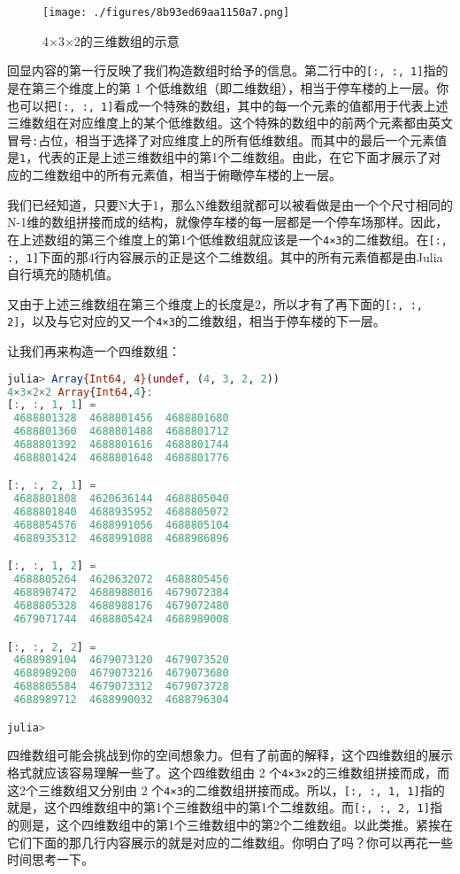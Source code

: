 \begin{figure}[ht]
\centering
\texttt{[image: ./figures/8b93ed69aa1150a7.png]}
\caption{4×3×2的三维数组的示意} \label{fig_JuC9S3_1}
\end{figure}


回显内容的第一行反映了我们构造数组时给予的信息。第二行中的\verb`[:, :, 1]`指的是在第三个维度上的第 1 个低维数组（即二维数组），相当于停车楼的上一层。你也可以把\verb`[:, :, 1]`看成一个特殊的数组，其中的每一个元素的值都用于代表上述三维数组在对应维度上的某个低维数组。这个特殊的数组中的前两个元素都由英文冒号\verb`:`占位，相当于选择了对应维度上的所有低维数组。而其中的最后一个元素值是\verb`1`，代表的正是上述三维数组中的第1个二维数组。由此，在它下面才展示了对应的二维数组中的所有元素值，相当于俯瞰停车楼的上一层。

我们已经知道，只要N大于1，那么N维数组就都可以被看做是由一个个尺寸相同的N-1维的数组拼接而成的结构，就像停车楼的每一层都是一个停车场那样。因此，在上述数组的第三个维度上的第1个低维数组就应该是一个\verb`4×3`的二维数组。在\verb`[:, :, 1]`下面的那4行内容展示的正是这个二维数组。其中的所有元素值都是由Julia自行填充的随机值。

又由于上述三维数组在第三个维度上的长度是2，所以才有了再下面的\verb`[:, :, 2]`，以及与它对应的又一个\verb`4×3`的二维数组，相当于停车楼的下一层。

让我们再来构造一个四维数组：

\begin{lstlisting}[language=julia]
julia> Array{Int64, 4}(undef, (4, 3, 2, 2))
4×3×2×2 Array{Int64,4}:
[:, :, 1, 1] =
 4688801328  4688801456  4688801680
 4688801360  4688801488  4688801712
 4688801392  4688801616  4688801744
 4688801424  4688801648  4688801776

[:, :, 2, 1] =
 4688801808  4620636144  4688805040
 4688801840  4688935952  4688805072
 4688854576  4688991056  4688805104
 4688935312  4688991088  4688986896

[:, :, 1, 2] =
 4688805264  4620632072  4688805456
 4688987472  4688988016  4679072384
 4688805328  4688988176  4679072480
 4679071744  4688805424  4688989008

[:, :, 2, 2] =
 4688989104  4679073120  4679073520
 4688989200  4679073216  4679073680
 4688805584  4679073312  4679073728
 4688989712  4688990032  4688796304

julia> 
\end{lstlisting}

四维数组可能会挑战到你的空间想象力。但有了前面的解释，这个四维数组的展示格式就应该容易理解一些了。这个四维数组由 2 个\verb`4×3×2`的三维数组拼接而成，而这2个三维数组又分别由 2 个\verb`4×3`的二维数组拼接而成。所以，\verb`[:, :, 1, 1]`指的就是，这个四维数组中的第1个三维数组中的第1个二维数组。而\verb`[:, :, 2, 1]`指的则是，这个四维数组中的第1个三维数组中的第2个二维数组。以此类推。紧挨在它们下面的那几行内容展示的就是对应的二维数组。你明白了吗？你可以再花一些时间思考一下。

